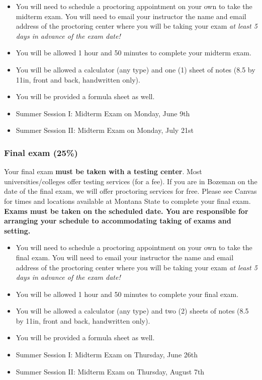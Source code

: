 \documentclass[
]{article}
\providecommand{\tightlist}{%
  \setlength{\itemsep}{0pt}\setlength{\parskip}{0pt}}
\begin{document}
\begin{itemize}
\tightlist
\item
  You will need to schedule a proctoring appointment on your own to take
  the midterm exam. You will need to email your instructor the name and
  email address of the proctoring center where you will be taking your
  exam \emph{at least 5 days in advance of the exam date!}
\item
  You will be allowed 1 hour and 50 minutes to complete your midterm
  exam.\\
\item
  You will be allowed a calculator (any type) and one (1) sheet of notes
  (8.5 by 11in, front and back, handwritten only).
\item
  You will be provided a formula sheet as well.
\item
  Summer Session I: Midterm Exam on Monday, June 9th
\item
  Summer Session II: Midterm Exam on Monday, July 21st
\end{itemize}

\subsubsection{Final exam (25\%)}\label{final-exam-25}

Your final exam \textbf{must be taken with a testing center}. Most
universities/colleges offer testing services (for a fee). If you are in
Bozeman on the date of the final exam, we will offer proctoring services
for free. Please see Canvas for times and locations available at Montana
State to complete your final exam. \textbf{Exams must be taken on the
scheduled date. You are responsible for arranging your schedule to
accommodating taking of exams and setting.}

\begin{itemize}
\tightlist
\item
  You will need to schedule a proctoring appointment on your own to take
  the final exam. You will need to email your instructor the name and
  email address of the proctoring center where you will be taking your
  exam \emph{at least 5 days in advance of the exam date!}
\item
  You will be allowed 1 hour and 50 minutes to complete your final
  exam.\\
\item
  You will be allowed a calculator (any type) and two (2) sheets of
  notes (8.5 by 11in, front and back, handwritten only).
\item
  You will be provided a formula sheet as well.
\item
  Summer Session I: Midterm Exam on Thursday, June 26th
\item
  Summer Session II: Midterm Exam on Thursday, August 7th
\end{itemize}
\end{document}

